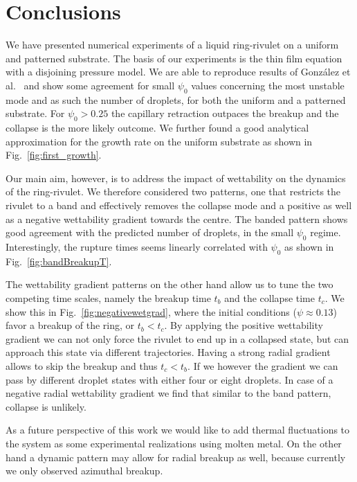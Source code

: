 \documentclass[twoside,twocolumn,9pt]{article}
\begin{document}
\section{Conclusions}\label{sec:conclu}
We have presented numerical experiments of a liquid ring-rivulet on a uniform and patterned substrate. 
The basis of our experiments is the thin film equation with a disjoining pressure model.
We are able to reproduce results of Gonz{\'a}lez et al.~\cite{gonzalezStabilityLiquidRing2013} and show some agreement for small $\psi_0$ values concerning the most unstable mode and as such the number of droplets, for both the uniform and a patterned substrate.
For $\psi_0 > 0.25$ the capillary retraction outpaces the breakup and the collapse is the more likely outcome.
We further found a good analytical approximation for the growth rate on the uniform substrate as shown in Fig.~\ref{fig:first_growth}. 

Our main aim, however, is to address the impact of wettability on the dynamics of the ring-rivulet.
We therefore considered two patterns, one that restricts the rivulet to a band and effectively removes the collapse mode and a positive as well as a negative wettability gradient towards the centre.
The banded pattern shows good agreement with the predicted number of droplets, in the small $\psi_0$ regime. 
Interestingly, the rupture times seems linearly correlated with $\psi_0$ as shown in Fig.~\ref{fig:bandBreakupT}.

The wettability gradient patterns on the other hand allow us to tune the two competing time scales, namely the breakup time $t_b$ and the collapse time $t_c$.
We show this in Fig.~\ref{fig:negativewetgrad}, where the initial conditions ($\psi \approx 0.13$) favor a breakup of the ring, or $t_b < t_c$.
By applying the positive wettability gradient we can not only force the rivulet to end up in a collapsed state, but can approach this state via different trajectories. 
Having a strong radial gradient allows to skip the breakup and thus $t_c < t_b$.
If we however the gradient we can pass by different droplet states with either four or eight droplets.
In case of a negative radial wettability gradient we find that similar to the band pattern, collapse is unlikely.

As a future perspective of this work we would like to add thermal fluctuations to the system as some experimental realizations using molten metal.
On the other hand a dynamic pattern may allow for radial breakup as well, because currently we only observed azimuthal breakup.
\end{document}
